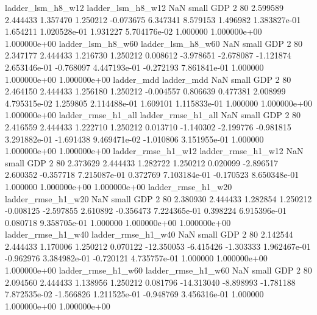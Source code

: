       ladder_lsm_h8_w12        ladder_lsm_h8_w12                   NaN      small      GDP                 2 80 2.599589       2.444433 1.357470       1.250212   -0.073675      6.347341      8.579153     1.496982   1.383827e-01  1.654211 1.020528e-01     1.931227   5.704176e-02            1.000000    1.000000e+00        1.000000e+00
       ladder_lsm_h8_w60        ladder_lsm_h8_w60                   NaN      small      GDP                 2 80 2.347177       2.444433 1.216730       1.250212    0.008612     -3.978651     -2.678087    -1.121874   2.653146e-01 -0.768097 4.447193e-01    -0.272193   7.861841e-01            1.000000    1.000000e+00        1.000000e+00
              ladder_mdd               ladder_mdd                   NaN      small      GDP                 2 80 2.464150       2.444433 1.256180       1.250212   -0.004557      0.806639      0.477381     2.008999   4.795315e-02  1.259805 2.114488e-01     1.609101   1.115833e-01            1.000000    1.000000e+00        1.000000e+00
      ladder_rmse_h1_all       ladder_rmse_h1_all                   NaN      small      GDP                 2 80 2.416559       2.444433 1.222710       1.250212    0.013710     -1.140302     -2.199776    -0.981815   3.291882e-01 -1.691438 9.469471e-02    -1.010806   3.151955e-01            1.000000    1.000000e+00        1.000000e+00
      ladder_rmse_h1_w12       ladder_rmse_h1_w12                   NaN      small      GDP                 2 80 2.373629       2.444433 1.282722       1.250212    0.020099     -2.896517      2.600352    -0.357718   7.215087e-01  0.372769 7.103184e-01    -0.170523   8.650348e-01            1.000000    1.000000e+00        1.000000e+00
      ladder_rmse_h1_w20       ladder_rmse_h1_w20                   NaN      small      GDP                 2 80 2.380930       2.444433 1.282854       1.250212   -0.008125     -2.597855      2.610892    -0.356473   7.224365e-01  0.398224 6.915396e-01     0.080718   9.358705e-01            1.000000    1.000000e+00        1.000000e+00
      ladder_rmse_h1_w40       ladder_rmse_h1_w40                   NaN      small      GDP                 2 80 2.142544       2.444433 1.170006       1.250212    0.070122    -12.350053     -6.415426    -1.303333   1.962467e-01 -0.962976 3.384982e-01    -0.720121   4.735757e-01            1.000000    1.000000e+00        1.000000e+00
      ladder_rmse_h1_w60       ladder_rmse_h1_w60                   NaN      small      GDP                 2 80 2.094560       2.444433 1.138956       1.250212    0.081796    -14.313040     -8.898993    -1.781188   7.872535e-02 -1.566826 1.211525e-01    -0.948769   3.456316e-01            1.000000    1.000000e+00        1.000000e+00

